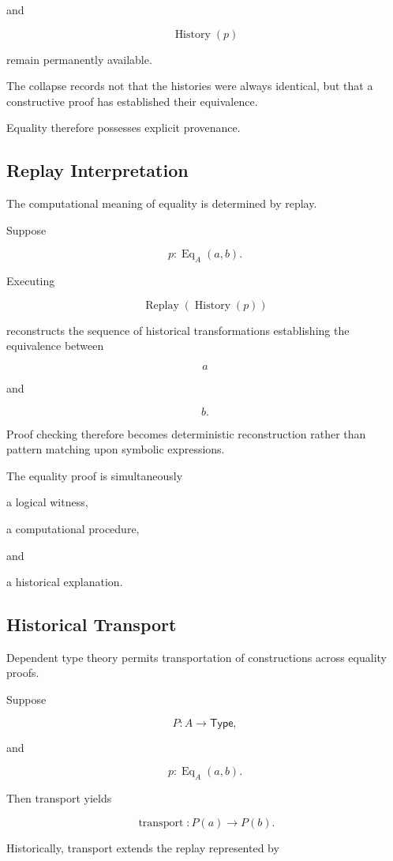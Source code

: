 \documentclass[12pt,oneside]{article}
\theoremstyle{definition}
\theoremstyle{remark}
\newcommand{\Type}{\mathsf{Type}}
\DeclareMathOperator{\History}{History}
\DeclareMathOperator{\Replay}{Replay}
\begin{document}
and

\[
\History(p)
\]

remain permanently available.

The collapse records not that the histories were always identical, but that a
constructive proof has established their equivalence.

Equality therefore possesses explicit provenance.

\subsection{Replay Interpretation}

The computational meaning of equality is determined by replay.

Suppose

\[
p
:
\operatorname{Eq}_A(a,b).
\]

Executing

\[
\Replay(\History(p))
\]

reconstructs the sequence of historical transformations establishing the
equivalence between

\[
a
\]

and

\[
b.
\]

Proof checking therefore becomes deterministic reconstruction rather than
pattern matching upon symbolic expressions.

The equality proof is simultaneously

a logical witness,

a computational procedure,

and

a historical explanation.

\subsection{Historical Transport}

Dependent type theory permits transportation of constructions across equality
proofs.

Suppose

\[
P
:
A
\rightarrow
\Type,
\]

and

\[
p
:
\operatorname{Eq}_A(a,b).
\]

Then transport yields

\[
\operatorname{transport}
:
P(a)
\rightarrow
P(b).
\]

Historically, transport extends the replay represented by
\end{document}
